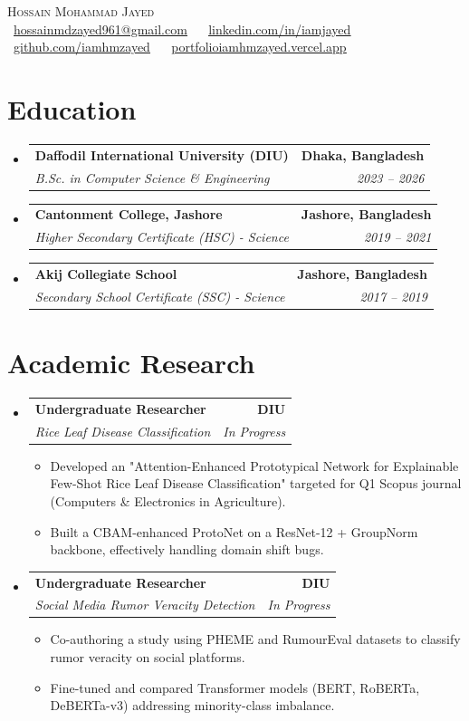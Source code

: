 \documentclass[letterpaper,10.5pt]{article}
\makeatletter
\newcommand{\resumeItem}[1]{
  \item\small{
    {#1 \vspace{-2pt}}
  }
}
\newcommand{\resumeSubheading}[4]{
  \vspace{-2pt}\item
    \begin{tabular*}{1.0\textwidth}[t]{l@{\extracolsep{\fill}}r}
      \textbf{#1} & \textbf{#2} \\
      \textit{\small#3} & \textit{\small #4} \\
    \end{tabular*}\vspace{-7pt}
}
\newcommand{\resumeSubHeadingListStart}{\begin{itemize}[leftmargin=0.15in, label={}]}
\newcommand{\resumeSubHeadingListEnd}{\end{itemize}}
\newcommand{\resumeItemListStart}{\begin{itemize}}
\newcommand{\resumeItemListEnd}{\end{itemize}\vspace{-5pt}}
\makeatother
\begin{document}
\begin{center}
    {\Huge \scshape Hossain Mohammad Jayed} \\ \vspace{5pt}
    \small \faEnvelope\ \href{mailto:hossainmdzayed961@gmail.com}{\underline{hossainmdzayed961@gmail.com}} ~ 
    \faLinkedin\ \href{https://linkedin.com/in/iamjayed}{\underline{linkedin.com/in/iamjayed}} ~
    \faGithub\ \href{https://github.com/iamhmzayed}{\underline{github.com/iamhmzayed}} ~
    \faGlobe\ \href{https://portfolioiamhmzayed.vercel.app/}{\underline{portfolioiamhmzayed.vercel.app}}
\end{center}

\section{Education}
  \resumeSubHeadingListStart
    \resumeSubheading
      {Daffodil International University (DIU)}{Dhaka, Bangladesh}
      {B.Sc. in Computer Science \& Engineering}{2023 -- 2026}
    \resumeSubheading
      {Cantonment College, Jashore}{Jashore, Bangladesh}
      {Higher Secondary Certificate (HSC) - Science}{2019 -- 2021}
    \resumeSubheading
      {Akij Collegiate School}{Jashore, Bangladesh}
      {Secondary School Certificate (SSC) - Science}{2017 -- 2019}
  \resumeSubHeadingListEnd

\section{Academic Research}
  \resumeSubHeadingListStart
    \resumeSubheading
      {Undergraduate Researcher}{DIU}
      {Rice Leaf Disease Classification}{In Progress}
      \resumeItemListStart
        \resumeItem{Developed an "Attention-Enhanced Prototypical Network for Explainable Few-Shot Rice Leaf Disease Classification" targeted for Q1 Scopus journal (Computers \& Electronics in Agriculture).}
        \resumeItem{Built a CBAM-enhanced ProtoNet on a ResNet-12 + GroupNorm backbone, effectively handling domain shift bugs.}
      \resumeItemListEnd
      
    \resumeSubheading
      {Undergraduate Researcher}{DIU}
      {Social Media Rumor Veracity Detection}{In Progress}
      \resumeItemListStart
        \resumeItem{Co-authoring a study using PHEME and RumourEval datasets to classify rumor veracity on social platforms.}
        \resumeItem{Fine-tuned and compared Transformer models (BERT, RoBERTa, DeBERTa-v3) addressing minority-class imbalance.}
      \resumeItemListEnd
  \resumeSubHeadingListEnd
\end{document}
